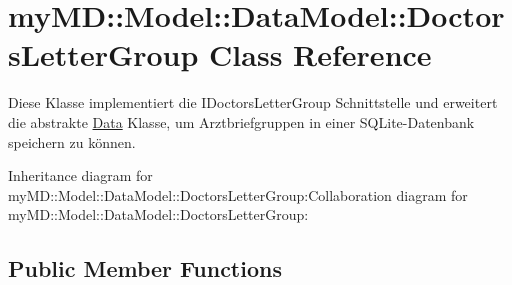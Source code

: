\hypertarget{classmy_m_d_1_1_model_1_1_data_model_1_1_doctors_letter_group}{
\section{my\-MD::Model::Data\-Model::Doctors\-Letter\-Group Class Reference}
\label{db/dfe/classmy_m_d_1_1_model_1_1_data_model_1_1_doctors_letter_group}
}
Diese Klasse implementiert die IDoctors\-Letter\-Group Schnittstelle und erweitert die abstrakte \hyperlink{classmy_m_d_1_1_model_1_1_data_model_1_1_data}{Data} Klasse, um Arztbriefgruppen in einer SQLite-Datenbank speichern zu k\"{o}nnen.  


Inheritance diagram for my\-MD::Model::Data\-Model::Doctors\-Letter\-Group:Collaboration diagram for my\-MD::Model::Data\-Model::Doctors\-Letter\-Group:\subsection*{Public Member Functions}
